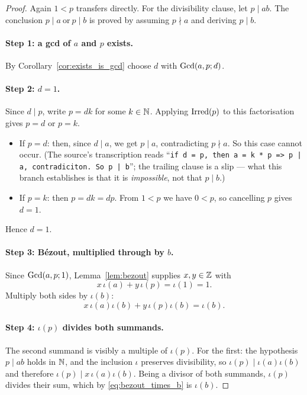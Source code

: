 \begin{proof}
  \leanok
  Again $1 < p$ transfers directly. For the divisibility clause, let
  $p \mid a b$. The conclusion $p \mid a \ \text{or}\ p \mid b$ is proved by
  assuming $p \nmid a$ and deriving $p \mid b$.

  \paragraph{Step 1: a gcd of $a$ and $p$ exists.}
  By Corollary~\ref{cor:exists_is_gcd} choose $d$ with $\mathrm{Gcd}(a,p;d)$.

  \paragraph{Step 2: $d = 1$.}
  Since $d \mid p$, write $p = d k$ for some $k \in \mathbb{N}$. Applying $\mathrm{Irred}(p)$ to
  this factorisation gives $p = d$ or $p = k$.
  \begin{itemize}
    \item If $p = d$: then, since $d \mid a$, we get $p \mid a$, contradicting
      $p \nmid a$. So this case cannot occur. (The source's transcription reads
      ``\texttt{if d = p, then a = k * p => p | a, contradiciton. So p | b}''; the
      trailing clause is a slip --- what this branch establishes is that it is
      \emph{impossible}, not that $p \mid b$.)
    \item If $p = k$: then $p = d k = d p$. From $1 < p$ we have $0 < p$, so
      cancelling $p$ gives $d = 1$.
  \end{itemize}
  Hence $d = 1$.

  \paragraph{Step 3: B\'ezout, multiplied through by $b$.}
  Since $\mathrm{Gcd}(a,p;1)$, Lemma~\ref{lem:bezout} supplies
  $x, y \in \mathbb{Z}$ with
  \[
    x\,\iota(a) + y\,\iota(p) = \iota(1) = 1 .
  \]
  Multiply both sides by $\iota(b)$:
  \begin{equation}\label{eq:bezout_times_b}
    x\,\iota(a)\iota(b) + y\,\iota(p)\iota(b) = \iota(b) .
  \end{equation}

  \paragraph{Step 4: $\iota(p)$ divides both summands.}
  The second summand is visibly a multiple of $\iota(p)$. For the first: the
  hypothesis $p \mid a b$ holds in $\mathbb{N}$, and the inclusion $\iota$ preserves
  divisibility, so $\iota(p) \mid \iota(a)\iota(b)$ and therefore
  $\iota(p) \mid x\,\iota(a)\iota(b)$. Being a divisor of both summands,
  $\iota(p)$ divides their sum, which by \eqref{eq:bezout_times_b} is
  $\iota(b)$.


\end{proof}
